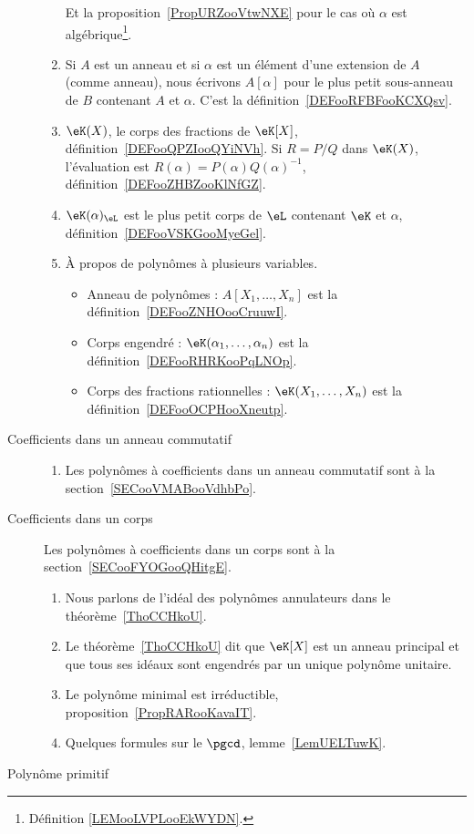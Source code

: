 \begin{description}
\begin{enumerate}
		            Et la proposition~\ref{PropURZooVtwNXE} pour le cas où \( \alpha\) est algébrique\footnote{Définition \ref{LEMooLVPLooEkWYDN}.}.
		      \item
		            Si \( A\) est un anneau et si \( \alpha\) est un élément d'une extension de \( A\) (comme anneau), nous écrivons \( A[\alpha]\) pour le plus petit sous-anneau de \( B\) contenant \( A\) et \( \alpha\). C'est la définition~\ref{DEFooRFBFooKCXQsv}.
		      \item
		            \( \eK(X)\), le corps des fractions de \( \eK[X]\), définition~\ref{DEFooQPZIooQYiNVh}. Si \( R=P/Q\) dans \( \eK(X)\), l'évaluation est \( R(\alpha)=P(\alpha)Q(\alpha)^{-1}\), définition~\ref{DEFooZHBZooKlNfGZ}.
		      \item
		            \( \eK(\alpha)_{\eL}\) est le plus petit corps de \( \eL\) contenant \( \eK\) et \( \alpha\), définition~\ref{DEFooVSKGooMyeGel}.
		      \item
		            À propos de polynômes à plusieurs variables.
		            \begin{itemize}
			            \item Anneau de polynômes : \( A[X_1,\ldots, X_n]\) est la définition~\ref{DEFooZNHOooCruuwI}.
			            \item Corps engendré : \( \eK(\alpha_1,\ldots, \alpha_n)\) est la définition~\ref{DEFooRHRKooPqLNOp}.
			            \item Corps des fractions rationnelles : \( \eK(X_1,\ldots, X_n)\) est la définition~\ref{DEFooOCPHooXneutp}.
		            \end{itemize}
	      \end{enumerate}

	\item[Coefficients dans un anneau commutatif]

	      \begin{enumerate}
		      \item
		            Les polynômes à coefficients dans un anneau commutatif  sont à la section~\ref{SECooVMABooVdhbPo}.
	      \end{enumerate}


	\item[Coefficients dans un corps]
	      Les polynômes à coefficients dans un corps sont à la section~\ref{SECooFYOGooQHitgE}.
	      \begin{enumerate}

		      \item
		            Nous parlons de l'idéal des polynômes annulateurs dans le théorème~\ref{ThoCCHkoU}.
		      \item
		            Le théorème~\ref{ThoCCHkoU} dit que \( \eK[X]\) est un anneau principal et que tous ses idéaux sont engendrés par un unique polynôme unitaire.
		      \item
		            Le polynôme minimal est irréductible, proposition~\ref{PropRARooKavaIT}.
		      \item
		            Quelques formules sur le \( \pgcd\), lemme~\ref{LemUELTuwK}.
	      \end{enumerate}
	\item[Polynôme primitif]


\end{description}
